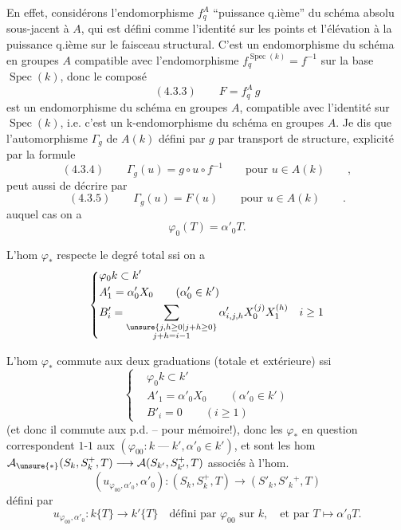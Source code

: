 En effet, considérons l'endomorphisme $f_q^A$ ``puissance q.ième''
du schéma absolu sous-jacent à $A$, qui est défini comme l'identité
sur les points et l'élévation à la puissance q.ième sur le faisceau
structural. C'est un endomorphisme du schéma en groupes $A$ compatible
avec l'endomorphisme $f_q^{\operatorname{Spec}(k)}=f^{-1}$ sur la base $\operatorname{Spec}(k)$, donc le
composé
\[
 (4.3.3)\qquad F=f_q^A\,g
\]
est un endomorphisme du schéma en groupes $A$, compatible avec l'identité
sur $\operatorname{Spec}(k)$, i.e. c'est un k-endomorphisme du schéma en groupes $A$.
Je dis que l'automorphisme $\Gamma_g$ de $A(k)$ défini par $g$ par transport de
structure, explicité par la formule
\[
 (4.3.4)\qquad \Gamma_g(u)=g\circ u\circ f^{-1}\qquad\text{pour }u\in A(k)\qquad,
\]
peut aussi de décrire par
\[
 (4.3.5)\qquad\Gamma_g(u)=F(u)\qquad\text{pour }u\in A(k)\qquad.
\]
auquel cas on a
\[
 \varphi_0(T)=\alpha'_0T.
\]

L'hom $\varphi_*$ respecte le degré total ssi on a
\[
 \left\{\begin{aligned}
 &\varphi_0 k\subset k'\\
 &A'_1=\alpha'_0X_0\qquad(\alpha'_0\in k')\\
 &B'_i=\sum_{\substack{\unsure{j,h\geq0|j+h\geq0}\\j+h=i-1}}
 \alpha'_{i,j,h}X_0^{(j)}X_1^{(h)}\quad i\geq1
 \end{aligned}\right.
\]

L'hom $\varphi_*$ commute aux deux graduations (totale et extérieure) ssi
\[
 \left\{\begin{aligned}
 &\varphi_0 k\subset k'\\
 &A'_1=\alpha'_0X_0\qquad(\alpha'_0\in k')\\
 &B'_i=0\qquad(i\geq1)
 \end{aligned}\right.
\]
(et donc il commute aux p.d. -- pour mémoire!),
donc les $\varphi_*$ en question correspondent $1$-$1$ aux
$(\varphi_{00}:k\mathbin{\text{---}}k',\alpha'_0\in k')$, et
sont les hom 
$\mathcal A_{\unsure{*}}(S_k,S_k^+,T)\longrightarrow\mathcal A(S_{k'},S_{k'}^+,T)$
associés à l'hom.
\[
 (u_{\varphi_{00},\alpha'_0},\alpha'_0):(S_k,S_k^+,T)
 \longrightarrow(S'_k,S'_k{}^+,T)
\]
défini par
\[
 u_{\varphi_{00},\alpha'_0}:k\{T\}\longrightarrow k'\{T\}
 \quad\text{défini par }\varphi_{00}\text{ sur }k,\quad
 \text{et par }T\longmapsto\alpha'_0T.
\]

